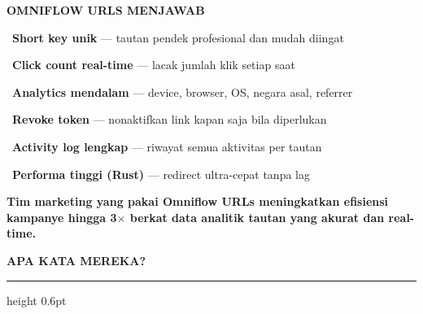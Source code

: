 \documentclass[a4paper]{article}
\newcommand{\sectiontitle}[1]{%
    \vspace{10pt}%
    {\fontsize{13}{16}\selectfont\bfseries\color{BlueDark} #1}\par\vspace{3pt}%
    {\color{BluePrimary}\hrule height 0.6pt}\par\vspace{8pt}%
}
\begin{document}
\begin{minipage}[t]{0.485\textwidth}
    \colorbox{CyanPrimary}{%
        \begin{minipage}{\dimexpr\textwidth-14pt}
            \vspace{5pt}
            {\fontsize{10}{13}\selectfont\bfseries\color{White} OMNIFLOW URLS MENJAWAB}
            \vspace{5pt}
        \end{minipage}}
    \vspace{6pt}

    {\fontsize{9.5}{13}\selectfont\color{TextDark}%
    \textbullet\ \textbf{Short key unik} --- tautan pendek profesional dan mudah diingat\par\vspace{4pt}%
    \textbullet\ \textbf{Click count real-time} --- lacak jumlah klik setiap saat\par\vspace{4pt}%
    \textbullet\ \textbf{Analytics mendalam} --- device, browser, OS, negara asal, referrer\par\vspace{4pt}%
    \textbullet\ \textbf{Revoke token} --- nonaktifkan link kapan saja bila diperlukan\par\vspace{4pt}%
    \textbullet\ \textbf{Activity log lengkap} --- riwayat semua aktivitas per tautan\par\vspace{4pt}%
    \textbullet\ \textbf{Performa tinggi (Rust)} --- redirect ultra-cepat tanpa lag}%
\end{minipage}

\vspace{8pt}

{\setlength{\fboxsep}{7pt}\setlength{\fboxrule}{0pt}%
\noindent\colorbox{CyanPrimary}{%
    \begin{minipage}{\dimexpr\textwidth-2\fboxsep\relax}
        \centering
        {\fontsize{9.5}{12}\selectfont\bfseries\color{White}
        Tim marketing yang pakai Omniflow URLs meningkatkan \textbf{efisiensi kampanye hingga 3$\times$} berkat data analitik tautan yang akurat dan real-time.}
    \end{minipage}}}

\vspace{8pt}
\sectiontitle{APA KATA MEREKA?}
\end{document}
